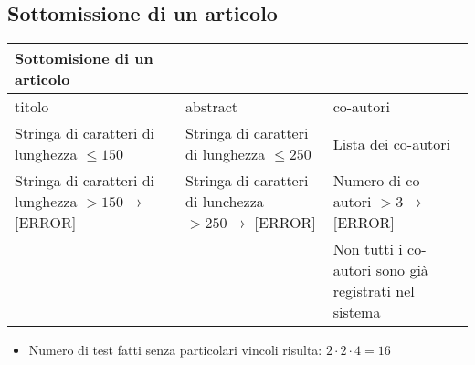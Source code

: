 \subsection{Sottomissione di un articolo}
\label{sec:test_sottomissione}
\begin{tabular}{|p{4cm}|p{4cm}|p{4cm}|}
  \hline
  \rowcolor{SkyBlue}
  Sottomisione di un articolo & & \\
  \hline
  \hline
  titolo & abstract & co-autori \\
  \hline
  Stringa di caratteri di lunghezza \(\leq 150\)  & Stringa di caratteri di lunghezza \(\leq 250\) & Lista dei co-autori \\
  \hline
  Stringa di caratteri di lunghezza \(> 150 \rightarrow\) [ERROR] & Stringa di caratteri di lunchezza \(> 250 \rightarrow\) [ERROR]& Numero di co-autori \(> 3 \rightarrow\) [ERROR]\\
  \hline
   & & Non tutti i co-autori sono già registrati nel sistema\\
  \hline
\end{tabular}
\begin{itemize}
\item Numero di test fatti senza particolari vincoli risulta: \(2\cdot2\cdot4 = 16\)
\end{itemize}
